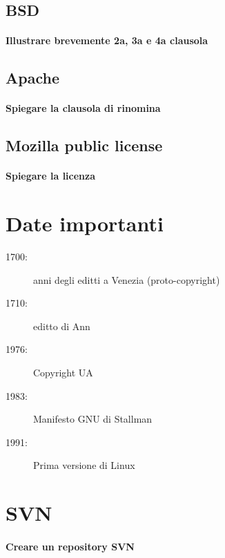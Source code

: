 \documentclass[a4paper]{article}
\begin{document}
		\subsection{BSD}
		
			\paragraph{Illustrare brevemente 2a, 3a e 4a clausola}
			
		\subsection{Apache}
		
			\paragraph{Spiegare la clausola di rinomina}
			
	
		\subsection{Mozilla public license}
		
			\paragraph{Spiegare la licenza}
		
		
	\section{Date importanti}
	
	\begin{description}
		\item[1700:] anni degli editti a Venezia (proto-copyright)
		\item[1710:] editto di Ann
		\item[1976:] Copyright UA
		\item[1983:] Manifesto GNU di Stallman
		\item[1991:] Prima versione di Linux
	\end{description}
	
	
	\section{SVN}
	
	\paragraph{Creare un repository SVN}
	
\end{document}
